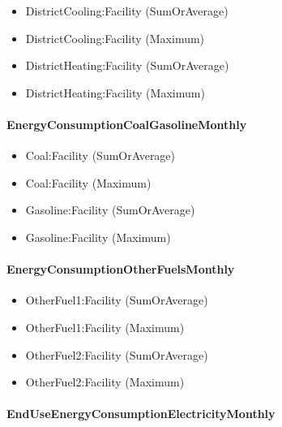 \begin{itemize}
\item
  DistrictCooling:Facility (SumOrAverage)
\item
  DistrictCooling:Facility (Maximum)
\item
  DistrictHeating:Facility (SumOrAverage)
\item
  DistrictHeating:Facility (Maximum)
\end{itemize}

\paragraph{EnergyConsumptionCoalGasolineMonthly}\label{energyconsumptioncoalgasolinemonthly}

\begin{itemize}
\item
  Coal:Facility (SumOrAverage)
\item
  Coal:Facility (Maximum)
\item
  Gasoline:Facility (SumOrAverage)
\item
  Gasoline:Facility (Maximum)
\end{itemize}

\paragraph{EnergyConsumptionOtherFuelsMonthly}\label{energyconsumptionotherfuelsmonthly}

\begin{itemize}
\item
  OtherFuel1:Facility (SumOrAverage)
\item
  OtherFuel1:Facility (Maximum)
\item
  OtherFuel2:Facility (SumOrAverage)
\item
  OtherFuel2:Facility (Maximum)
\end{itemize}

\paragraph{EndUseEnergyConsumptionElectricityMonthly}\label{enduseenergyconsumptionelectricitymonthly}

